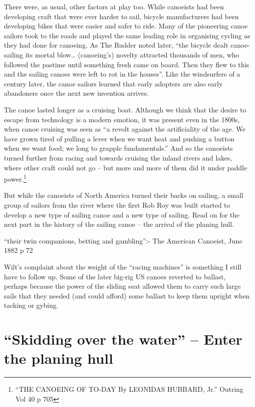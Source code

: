 \documentclass[
  letterpaper,
]{scrbook}
\begin{document}
There were, as usual, other factors at play too. While canoeists had
been developing craft that were ever harder to sail, bicycle
manufacturers had been developing bikes that were easier and safer to
ride. Many of the pioneering canoe sailors took to the roads and played
the same leading role in organising cycling as they had done for
canoeing. As The Rudder noted later, ``the bicycle dealt canoe-sailing
its mortal blow\ldots{} (canoeing's) novelty attracted thousands of men,
who followed the pastime until something fresh came on board. Then they
flew to this and the sailing canoes were left to rot in the houses''.
Like the windsurfers of a century later, the canoe sailors learned that
early adopters are also early abandoners once the next new invention
arrives.

The canoe lasted longer as a cruising boat. Although we think that the
desire to escape from technology is a modern emotion, it was present
even in the 1800s, when canoe cruising was seen as ``a revolt against
the artificiality of the age. We have grown tired of pulling a lever
when we want heat and pushing a button when we want food; we long to
grapple fundamentals.'' And so the canoeists turned further from racing
and towards cruising the inland rivers and lakes, where other craft
could not go -- but more and more of them did it under paddle
power.\footnote{``THE CANOEING OF TO-DAY By LEONIDAS HUBBARD, Jr.''
  Outring Vol 40 p 705}

But while the canoeists of North America turned their backs on sailing,
a small group of sailors from the river where the first Rob Roy was
built started to develop a new type of sailing canoe and a new type of
sailing. Read on for the next part in the history of the sailing canoe
-- the arrival of the planing hull.

``their twin companions, betting and gambling'':- The American Canoeist,
June 1882 p 72

Wilt's complaint about the weight of the ``racing machines'' is
something I still have to follow up. Some of the later big-rig US canoes
reverted to ballast, perhaps because the power of the sliding seat
allowed them to carry such large sails that they needed (and could
afford) some ballast to keep them upright when tacking or gybing.


\chapter{``Skidding over the water'' -- Enter the planing
hull}\label{sec-chapter7}
\end{document}
